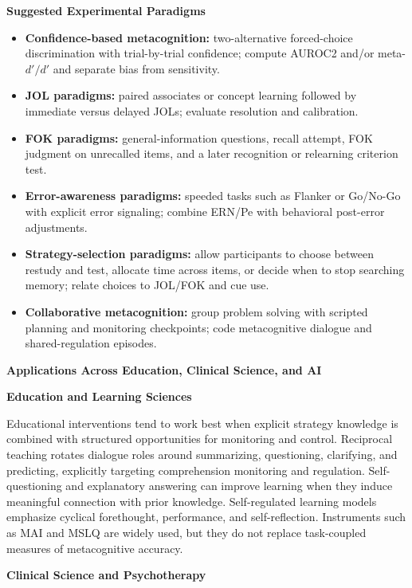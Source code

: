 \documentclass{book}
\providecommand{\ProjectDeepHeading}[2]{%
    \par\medskip\noindent\textbf{#2}\par\smallskip
}
\begin{document}
   \ProjectDeepHeading{6}{Suggested Experimental Paradigms}

   \begin{itemize}
      \item \textbf{Confidence-based metacognition:} two-alternative forced-choice discrimination with trial-by-trial confidence; compute AUROC2 and/or meta-$d'/d'$ and separate bias from sensitivity.
      \item \textbf{JOL paradigms:} paired associates or concept learning followed by immediate versus delayed JOLs; evaluate resolution and calibration.
      \item \textbf{FOK paradigms:} general-information questions, recall attempt, FOK judgment on unrecalled items, and a later recognition or relearning criterion test.
      \item \textbf{Error-awareness paradigms:} speeded tasks such as Flanker or Go/No-Go with explicit error signaling; combine ERN/Pe with behavioral post-error adjustments.
      \item \textbf{Strategy-selection paradigms:} allow participants to choose between restudy and test, allocate time across items, or decide when to stop searching memory; relate choices to JOL/FOK and cue use.
      \item \textbf{Collaborative metacognition:} group problem solving with scripted planning and monitoring checkpoints; code metacognitive dialogue and shared-regulation episodes.
   \end{itemize}

   \ProjectDeepHeading{5}{Applications Across Education, Clinical Science, and AI}

   \ProjectDeepHeading{6}{Education and Learning Sciences}

   Educational interventions tend to work best when explicit strategy knowledge is combined with structured opportunities for monitoring and control. Reciprocal teaching rotates dialogue roles around summarizing, questioning, clarifying, and predicting, explicitly targeting comprehension monitoring and regulation. Self-questioning and explanatory answering can improve learning when they induce meaningful connection with prior knowledge. Self-regulated learning models emphasize cyclical forethought, performance, and self-reflection. Instruments such as MAI and MSLQ are widely used, but they do not replace task-coupled measures of metacognitive accuracy.

   \ProjectDeepHeading{6}{Clinical Science and Psychotherapy}
\end{document}
